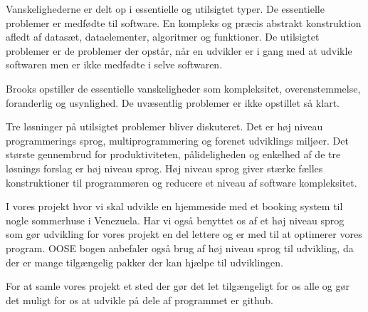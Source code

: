 \documentclass[12pt,a4paper]{article}
\begin{document}
Vanskelighederne er delt op i essentielle og utilsigtet typer. De essentielle problemer er medfødte  til software. En kompleks og præcis abstrakt konstruktion afledt af datasæt, dataelementer, algoritmer og funktioner. De utilsigtet problemer er de problemer der opstår, når en udvikler er i gang med at udvikle softwaren men er ikke medfødte i selve softwaren.

Brooks opstiller de essentielle vanskeligheder som kompleksitet, overenstemmelse, foranderlig og usynlighed. De uvæsentlig problemer er ikke opstillet så klart.

Tre løsninger på utilsigtet  problemer bliver diskuteret. Det er høj niveau programmerings sprog, multiprogrammering og forenet udviklings miljøer. Det største gennembrud for produktiviteten, pålideligheden og enkelhed af de tre løsnings forslag er høj niveau sprog. Høj niveau sprog giver stærke fælles konstruktioner til programmøren og reducere et niveau af software kompleksitet.

I vores projekt hvor vi skal udvikle en hjemmeside med et booking system til nogle sommerhuse i Venezuela. Har vi også benyttet os af et høj niveau sprog som gør udvikling for vores projekt en del lettere og er med til at optimerer vores program. OOSE bogen anbefaler også brug af høj niveau sprog til udvikling, da der er mange tilgængelig pakker der kan hjælpe til udviklingen.

For at samle vores projekt et sted der gør det let tilgængeligt for os alle og gør det muligt for os at udvikle på dele af programmet er github.
\end{document}
